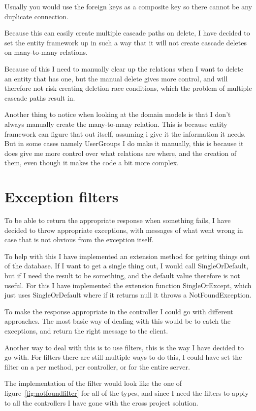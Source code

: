 Usually you would use the foreign keys as a composite key so there cannot be any
duplicate connection.

Because this can easily create multiple cascade paths on delete, I have decided
to set the entity framework up in such a way that it will not create cascade
deletes on many-to-many relations. 

Because of this I need to manually clear up the relations when I want to delete
an entity that has one, but the manual delete gives more control, and will
therefore not risk creating deletion race conditions, which the problem of
multiple cascade paths result in.

Another thing to notice when looking at the domain models is that I don't
always manually create the many-to-many relation. This is because entity
framework can figure that out itself, assuming i give it the information it
needs. But in some cases namely UserGroups I do make it manually, this is
because it does give me more control over what relations are where, and the
creation of them, even though it makes the code a bit more complex.

\section{Exception filters}
\label{sec:Exception filters}
To be able to return the appropriate response when something fails, I have
decided to throw appropriate exceptions, with messages of what went wrong in
case that is not obvious from the exception itself.

To help with this I have implemented an extension method for getting things out
of the database. If I want to get a single thing out, I would call
SingleOrDefault, but if I need the result to be something, and the default value
therefore is not useful. For this I have implemented the extension function
SingleOrExcept, which just uses SingleOrDefault where if it returns null it
throws a NotFoundException.

To make the response appropriate in the controller I could go with different
approaches. The most basic way of dealing with this would be to catch the
exceptions, and return the right message to the client.

Another way to deal with this is to use filters, this is the way I have decided
to go with. For filters there are still multiple ways to do this, I could have
set the filter on a per method, per controller, or for the entire server.

The implementation of the filter would look like the one of
figure~\ref{fig:notfoundfilter} for all of the types, and since I need the
filters to apply to all the controllers I have gone with the cross project
solution. 

